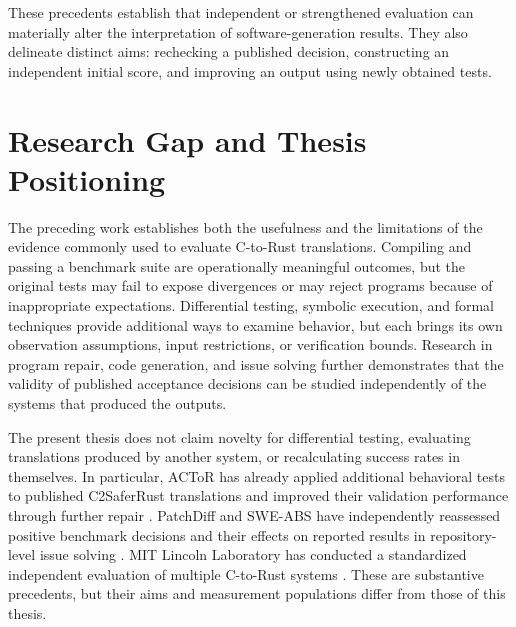These precedents establish that independent or strengthened evaluation
can materially alter the interpretation of software-generation results.
They also delineate distinct aims: rechecking a published decision,
constructing an independent initial score, and improving an output using
newly obtained tests.

\section{Research Gap and Thesis Positioning}
\label{sec:rw-positioning}

The preceding work establishes both the usefulness and the limitations
of the evidence commonly used to evaluate C-to-Rust translations.
Compiling and passing a benchmark suite are operationally meaningful
outcomes, but the original tests may fail to expose divergences or may
reject programs because of inappropriate expectations. Differential
testing, symbolic execution, and formal techniques provide additional
ways to examine behavior, but each brings its own observation
assumptions, input restrictions, or verification bounds. Research in
program repair, code generation, and issue solving further demonstrates
that the validity of published acceptance decisions can be studied
independently of the systems that produced the outputs.

The present thesis does not claim novelty for differential testing,
evaluating translations produced by another system, or recalculating
success rates in themselves. In particular, ACToR has already applied
additional behavioral tests to published C2SaferRust translations and
improved their validation performance through further repair
\cite{actor2025}. PatchDiff and SWE-ABS have independently reassessed
positive benchmark decisions and their effects on reported results in
repository-level issue solving \cite{wang2026patchdiff,yu2026sweabs}.
MIT Lincoln Laboratory has conducted a standardized independent
evaluation of multiple C-to-Rust systems
\cite{tractor-first-evaluation-report}. These are substantive
precedents, but their aims and measurement populations differ from those
of this thesis.

